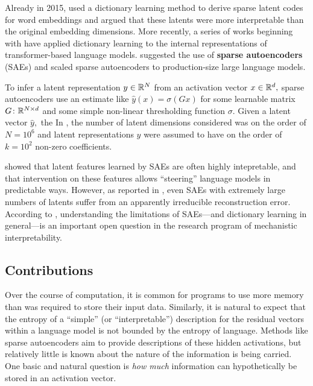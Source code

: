 Already in 2015, \cite{faruqui_sparse_2015} used a dictionary learning method to derive sparse latent codes for word embeddings and argued that these latents were more interpretable than the original embedding dimensions. More recently, a series of works beginning with \cite{yun_transformer_2021} have applied dictionary learning to the internal representations of transformer-based language models. \cite{cunningham_sparse_2023} suggested the use of \textbf{sparse autoencoders} (SAEs) and \cite{templeton_scaling_2024, gao_scaling_2024} scaled sparse autoencoders to production-size large language models.

To infer a latent representation $y \in \mathbb{R}^N$ from an activation vector $x \in \mathbb{R}^d,$ sparse autoencoders use an estimate like $\hat y(x) = \sigma(G x)$ for some learnable matrix $G \colon \mathbb{R}^{N \times d}$ and some simple non-linear thresholding function $\sigma.$ Given a latent vector $\hat y,$ the In \cite{gao_scaling_2024}, the number of latent dimensions considered was on the order of $N = 10^{6}$ and latent representations $y$ were assumed to have on the order of $k = 10^{2}$ non-zero coefficients.

\cite{templeton_scaling_2024} showed that latent features learned by SAEs are often highly intepretable, and that intervention on these features allows ``steering'' language models in predictable ways. However, as reported in \cite{gao_scaling_2024}, even SAEs with extremely large numbers of latents suffer from an apparently irreducible reconstruction error. According to \cite{sharkey_open_2025}, understanding the limitations of SAEs---and dictionary learning in general---is an important open question in the research program of mechanistic interpretability.

\subsection*{Contributions}

Over the course of computation, it is common for programs to use more memory than was required to store their input data. Similarly, it is natural to expect that the entropy of a ``simple'' (or ``interpretable'') description for the residual vectors within a language model is not bounded by the entropy of language. Methods like sparse autoencoders aim to provide descriptions of these hidden activations, but relatively little is known about the nature of the information is being carried. One basic and natural question is \textit{how much} information can hypothetically be stored in an activation vector.

